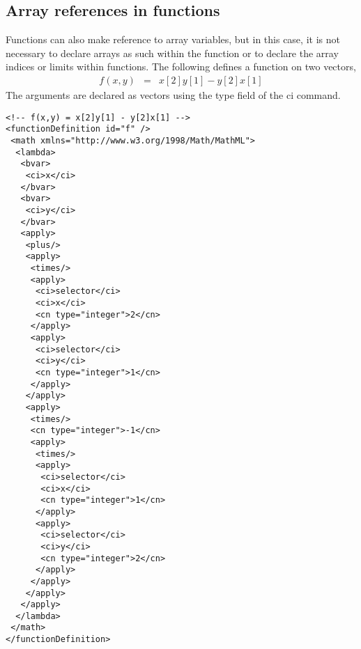 \subsection{Array references in functions}

Functions can also make reference to array variables, but in this case, it is not necessary to declare arrays as such within the function or to declare the array indices or limits within functions.  The following defines a function on two vectors, 
\begin{eqnarray*}
f(x,y) & = & x[2]y[1] - y[2]x[1]
\end{eqnarray*}
The arguments are declared as vectors using the type field of the ci command.

\begin{verbatim}
<!-- f(x,y) = x[2]y[1] - y[2]x[1] -->
<functionDefinition id="f" />
 <math xmlns="http://www.w3.org/1998/Math/MathML">
  <lambda>
   <bvar>
    <ci>x</ci>
   </bvar>
   <bvar>
    <ci>y</ci>
   </bvar>
   <apply>
    <plus/>
    <apply>
     <times/>
     <apply>
      <ci>selector</ci>
      <ci>x</ci>
      <cn type="integer">2</cn>
     </apply>
     <apply>
      <ci>selector</ci>
      <ci>y</ci>
      <cn type="integer">1</cn>
     </apply>
    </apply>
    <apply>
     <times/>
     <cn type="integer">-1</cn>
     <apply>
      <times/>
      <apply>
       <ci>selector</ci>
       <ci>x</ci>
       <cn type="integer">1</cn>
      </apply>
      <apply>
       <ci>selector</ci>
       <ci>y</ci>
       <cn type="integer">2</cn>
      </apply>
     </apply>
    </apply>
   </apply>
  </lambda>
 </math>
</functionDefinition>
\end{verbatim}



